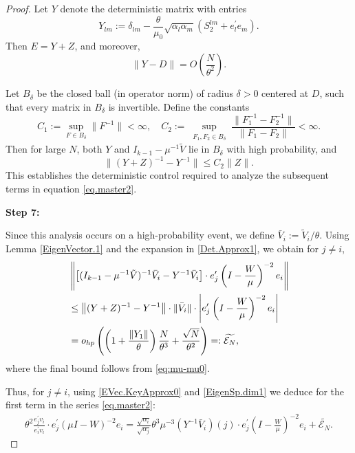 \documentclass[11pt, reqno]{amsart}
\numberwithin{equation}{section}
\begin{document}
\begin{proof}
Let $Y$ denote the deterministic matrix with entries
\begin{equation}\label{eq:Ymatrix}
Y_{lm} := \delta_{lm} - \frac{\theta}{\mu_0} \sqrt{\alpha_l \alpha_m} (S_2^{lm} + e_l^\prime e_m).
\end{equation}
Then $E = Y + Z$, and moreover,
\begin{equation}\label{Det.Approx2}
\|Y - D\| = O\left( \frac{N}{\theta^2} \right).
\end{equation}

Let $B_\delta$ be the closed ball (in operator norm) of radius $\delta > 0$ centered at $D$, such that every matrix in $B_\delta$ is invertible. Define the constants
\begin{equation}\label{InverseBound}
C_1 := \sup_{F \in B_\delta} \|F^{-1}\| < \infty, \quad
C_2 := \sup_{\substack{F_1, F_2 \in B_\delta}} \frac{\|F_1^{-1} - F_2^{-1}\|}{\|F_1 - F_2\|} < \infty.
\end{equation}
Then for large $N$, both $Y$ and $I_{k-1} - \mu^{-1}\tilde V$ lie in $B_\delta$ with high probability, and
\begin{equation}
\| (Y + Z)^{-1} - Y^{-1} \| \le C_2 \|Z\|.
\end{equation}
This establishes the deterministic control required to analyze the subsequent terms in equation \eqref{eq.master2}.




\textbf{Step 7:}

Since this analysis occurs on a high-probability event, we define \( \bar V_i := \tilde V_i/\theta \). Using Lemma \ref{EigenVector.1} and the expansion in \eqref{Det.Approx1}, we obtain for \( j \ne i \),
\begin{align}
& \left\| \left[ (I_{k-1} - \mu^{-1} \tilde V)^{-1} \bar V_i - Y^{-1} \bar V_i \right] \cdot e_j^\prime \left(I - \frac{W}{\mu}\right)^{-2} e_i \right\| \notag \\
& \le \left\| (Y + Z)^{-1} - Y^{-1} \right\| \cdot \|\bar V_i\| \cdot \left| e_j^\prime \left(I - \frac{W}{\mu} \right)^{-2} e_i \right| \notag \\
& = o_{hp} \left( \left(1 + \frac{\|Y_1\|}{\theta} \right) \frac{N}{\theta^3} + \frac{\sqrt{N}}{\theta^2} \right)=:\widetilde{\mathcal{E}_N}, \label{EVec.KeyApprox0}
\end{align}
where the final bound follows from \eqref{eq:mu-mu0}.

Thus, for \( j \ne i \), using \eqref{EVec.KeyApprox0} and \eqref{EigenSp.dim1} we deduce for the first term in the series \eqref{eq.master2}:
\begin{align}
\theta^2 \frac{e_j^\prime v_i}{e_i^\prime v_i} \cdot e_j^\prime (\mu I - W)^{-2} e_i 
= \frac{\sqrt{\alpha_i}}{\sqrt{\alpha_j}}\theta^3 \mu^{-3} (Y^{-1} \bar V_i)(j) \cdot e_j^\prime \left(I - \frac{W}{\mu}\right)^{-2} e_i + \widetilde{\mathcal{E}_N}. \label{EVec.KeyApprox1}
\end{align}


\end{proof}
\end{document}
